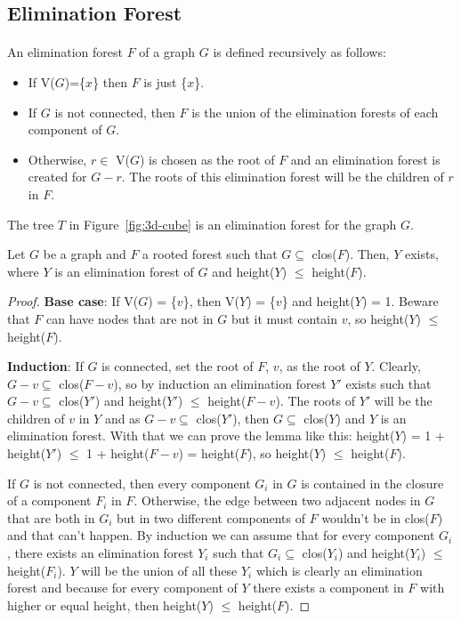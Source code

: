 \subsection{Elimination Forest}
\paragraph{}
An elimination forest $F$ of a graph $G$ is defined recursively as follows:
\begin{itemize}
  \item If V($G$)=\{$x$\} then $F$ is just \{$x$\}.
  \item If $G$ is not connected, then $F$ is the union of the elimination forests of each component of $G$.
  \item Otherwise, $r \in$ V($G$) is chosen as the root of $F$ and an elimination forest is created for $G - r$. The roots of this elimination forest will be the children of $r$ in $F$.
\end{itemize}
The tree $T$ in Figure~\ref{fig:3d-cube} is an elimination forest for the graph $G$.

\begin{lemma}
\label{lema:min-ET}
Let $G$ be a graph and $F$ a rooted forest such that $G \subseteq$ clos($F$). Then, $Y$ exists, where $Y$ is an elimination forest of $G$ and height($Y$) $\leq$ height($F$).
\end{lemma}

\begin{proof}
  \item \textbf{Base case}: If V($G$) = \{$v$\}, then V($Y$) = \{$v$\} and height($Y$) = 1. Beware that $F$ can have nodes that are not in $G$ but it must contain $v$, so height($Y$) $\leq$ height($F$).
  \item \textbf{Induction}: If $G$ is connected, set the root of $F$, $v$, as the root of $Y$. Clearly, $G-v \subseteq$ clos($F-v$), so by induction an elimination forest $Y'$ exists such that $G-v \subseteq$ clos($Y'$) and height($Y'$) $\leq$ height($F-v$). The roots of $Y'$ will be the children of $v$ in $Y$ and as $G-v \subseteq$ clos($Y'$), then $G \subseteq$ clos($Y$) and $Y$ is an elimination forest. With that we can prove the lemma like this: height($Y$) = 1 + height($Y'$) $\leq$ 1 + height($F-v$) = height($F$), so height($Y$) $\leq$ height($F$).
  
  If $G$ is not connected, then every component $G_i$ in $G$ is contained in the closure of a component $F_i$ in $F$. Otherwise, the edge between two adjacent nodes in $G$ that are both in $G_i$ but in two different components of $F$ wouldn't be in clos($F$) and that can't happen. By induction we can assume that for every component $G_i$, there exists an elimination forest $Y_i$ such that $G_i \subseteq$ clos($Y_i$) and height($Y_i$) $\leq$ height($F_i$). $Y$ will be the union of all these $Y_i$ which is clearly an elimination forest and because for every component of $Y$ there exists a component in $F$ with higher or equal height, then height($Y$) $\leq$ height($F$).
\end{proof}

